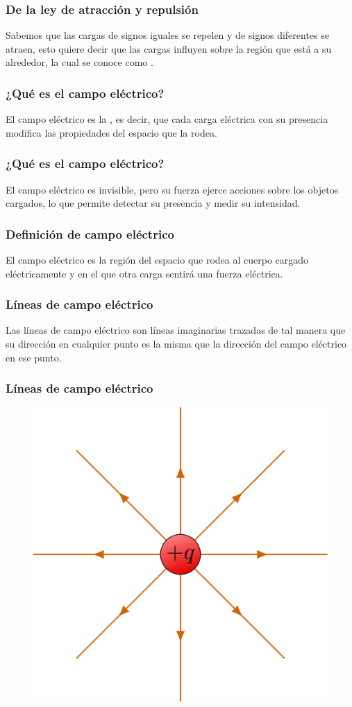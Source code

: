\documentclass[14pt]{beamer}
\begin{document}
\begin{frame}
\frametitle{De la ley de atracción y repulsión}
Sabemos que las cargas de signos iguales se repelen y de signos diferentes se atraen, esto quiere decir que las cargas influyen sobre la región que está a su alrededor, la cual se conoce como .
\end{frame}
\begin{frame}
\frametitle{¿Qué es el campo eléctrico?}
El campo eléctrico es la , \pause es decir, que cada carga eléctrica con su presencia modifica las propiedades del espacio que la rodea.
\end{frame}
\begin{frame}
\frametitle{¿Qué es el campo eléctrico?}    
El campo eléctrico es invisible, pero su fuerza ejerce acciones sobre los objetos cargados, lo que permite detectar su presencia y medir su intensidad.
\end{frame}
\begin{frame}
\frametitle{Definición de campo eléctrico}
El campo eléctrico es la región del espacio que rodea al cuerpo cargado eléctricamente y en el que otra carga sentirá una fuerza eléctrica.
\end{frame}
\begin{frame}
\frametitle{Líneas de campo eléctrico}
Las líneas de campo eléctrico son líneas imaginarias trazadas de tal manera que su dirección en cualquier punto es la misma que la dirección del campo eléctrico en ese punto.
\end{frame}
\begin{frame}
\frametitle{Líneas de campo eléctrico}
\begin{figure}
    \centering
    \includegraphics[scale=0.15]{Imagenes/Campo_Electrico_01.png}
\end{figure}
\end{frame}
\end{document}
